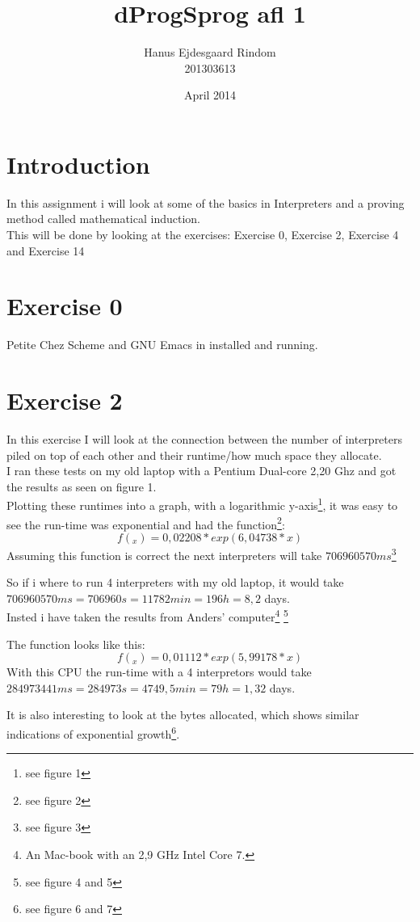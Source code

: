 \documentclass{article}
\title{dProgSprog afl 1}
\author{Hanus Ejdesgaard Rindom\\
201303613}
\date{April 2014}
\begin{document}
\maketitle

\section*{Introduction}
In this assignment i will look at some of the basics in Interpreters and a proving method called mathematical induction.\\
This will be done by looking at the exercises: Exercise 0, Exercise 2, Exercise 4 and Exercise 14

\section*{Exercise 0}
Petite Chez Scheme and GNU Emacs in installed and running.

\section*{Exercise 2}
In this exercise I will look at the connection between the number of interpreters piled on top of each other and their runtime/how much space they allocate.\\
I ran these tests on my old laptop with a Pentium Dual-core 2,20 Ghz and got the results as seen on figure 1.\\
Plotting these runtimes into a graph, with a logarithmic y-axis\footnote{see figure 1}, it was easy to see the run-time was exponential and had the function\footnote{see figure 2}:
    \[ f(_x) = 0,02208*exp(6,04738*x) \]
Assuming this function is correct the next interpreters will take $ 706960570ms $\footnote{see figure 3}

So if i where to run 4 interpreters with my old laptop, it would take $ 706960570ms=706960s=11782min=196h=8,2 $ days.\\
Insted i have taken the results from Anders' computer\footnote{An Mac-book with an 2,9 GHz Intel Core 7.} \footnote{see figure 4 and 5}

The function looks like this:
    \[ f(_x) = 0,01112*exp(5,99178*x) \]
With this CPU the run-time with a 4 interpretors would take $ 284973441ms=284973s=4749,5min=79h=1,32 $ days.

It is also interesting to look at the bytes allocated, which shows similar indications of exponential growth\footnote{see figure 6 and 7}.
\end{document}
